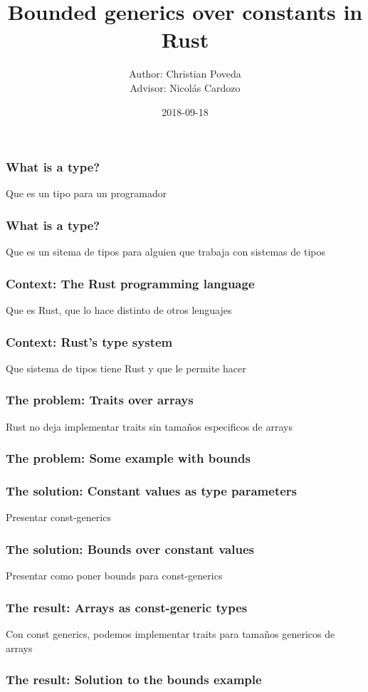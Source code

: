 \documentclass{beamer}
\title{Bounded generics over constants in Rust}
\author{Author: Christian Poveda \\ Advisor: Nicolás Cardozo}
\institute{Systems and Computing Engineering Department \\ Universidad de los Andes}
\date{2018-09-18}
\begin{document}
\frame{\titlepage}

\begin{frame}[fragile]
    \frametitle{What is a type?}
    Que es un tipo para un programador
\end{frame}

\begin{frame}[fragile]
    \frametitle{What is a type?}
    Que es un sitema de tipos para alguien que trabaja con sistemas de tipos
\end{frame}

\begin{frame}[fragile]
    \frametitle{Context: The Rust programming language}
    Que es Rust, que lo hace distinto de otros lenguajes
\end{frame}

\begin{frame}[fragile]
    \frametitle{Context: Rust's type system}
    Que sistema de tipos tiene Rust y que le permite hacer
\end{frame}

\begin{frame}[fragile]
    \frametitle{The problem: Traits over arrays}
    Rust no deja implementar traits sin tamaños especificos de arrays
\end{frame}

\begin{frame}[fragile]
    \frametitle{The problem: Some example with bounds}
\end{frame}

\begin{frame}[fragile]
    \frametitle{The solution: Constant values as type parameters}
    Presentar const-generics 
\end{frame}

\begin{frame}[fragile]
    \frametitle{The solution: Bounds over constant values}
    Presentar como poner bounds para const-generics 
\end{frame}

\begin{frame}[fragile]
    \frametitle{The result: Arrays as const-generic types}
    Con const generics, podemos implementar traits para tamaños genericos de arrays
\end{frame}

\begin{frame}[fragile]
    \frametitle{The result: Solution to the bounds example}
\end{frame}
\end{document}
